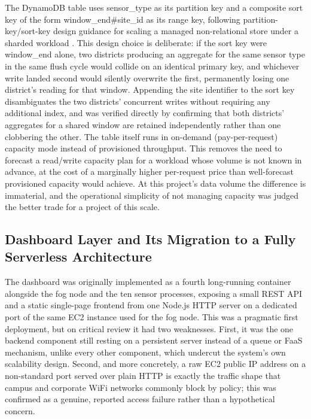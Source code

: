 \documentclass[conference]{IEEEtran}
\begin{document}
The DynamoDB table uses sensor\_type as its partition key and a composite sort key of the form window\_end\#site\_id as its range key, following partition-key/sort-key design guidance for scaling a managed non-relational store under a sharded workload \cite{ref14}. This design choice is deliberate: if the sort key were window\_end alone, two districts producing an aggregate for the same sensor type in the same flush cycle would collide on an identical primary key, and whichever write landed second would silently overwrite the first, permanently losing one district's reading for that window. Appending the site identifier to the sort key disambiguates the two districts' concurrent writes without requiring any additional index, and was verified directly by confirming that both districts' aggregates for a shared window are retained independently rather than one clobbering the other. The table itself runs in on-demand (pay-per-request) capacity mode instead of provisioned throughput. This removes the need to forecast a read/write capacity plan for a workload whose volume is not known in advance, at the cost of a marginally higher per-request price than well-forecast provisioned capacity would achieve. At this project's data volume the difference is immaterial, and the operational simplicity of not managing capacity was judged the better trade for a project of this scale.

\subsection{Dashboard Layer and Its Migration to a Fully Serverless Architecture}
The dashboard was originally implemented as a fourth long-running container alongside the fog node and the ten sensor processes, exposing a small REST API and a static single-page frontend from one Node.js HTTP server on a dedicated port of the same EC2 instance used for the fog node. This was a pragmatic first deployment, but on critical review it had two weaknesses. First, it was the one backend component still resting on a persistent server instead of a queue or FaaS mechanism, unlike every other component, which undercut the system's own scalability design. Second, and more concretely, a raw EC2 public IP address on a non-standard port served over plain HTTP is exactly the traffic shape that campus and corporate WiFi networks commonly block by policy; this was confirmed as a genuine, reported access failure rather than a hypothetical concern.
\end{document}
